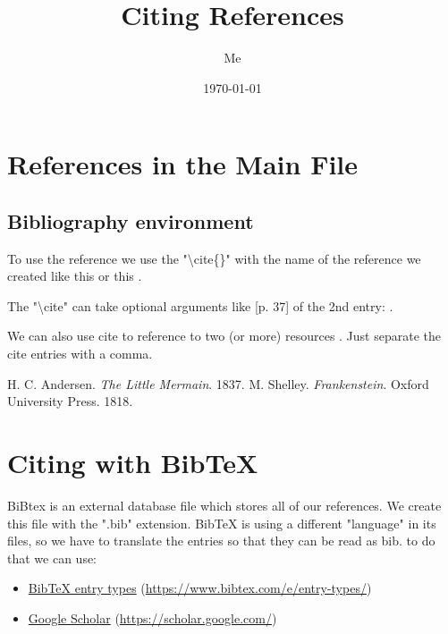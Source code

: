 \documentclass[12pt,titlepage]{article}
\title{Citing References}
\author{Me}
\date{\today}
\begin{document}
\maketitle

\newpage
\thispagestyle{empty}
\tableofcontents
\newpage

\section{References in the Main File}

\subsection{Bibliography environment}
To use the reference we use the "\textbackslash cite\{\}" with the name of the reference we created like this \cite{andersen} or this \cite{shelley}.

The "\textbackslash cite" can take optional arguments like [p. 37] of the 2nd entry: \cite[p.~37]{shelley}.

We can also use cite to reference to two (or more) resources \cite{andersen,shelley}. Just separate the cite entries with a comma.

\begin{thebibliography}{2} %
    H. C. Andersen. \textit{The Little Mermain}. 1837. 
    M. Shelley. \textit{Frankenstein}. Oxford University Press. 1818.
\end{thebibliography}

\section{Citing with BibTeX}
BiBtex is an external database file which stores all of our references. We create this file with the ".bib" extension. BibTeX is using a different "language" in its files, so we have to translate the entries so that they can be read as bib. to do that we can use:
\begin{itemize}
    \item \href{https://www.bibtex.com/e/entry-types/}{BibTeX entry types} (\url{https://www.bibtex.com/e/entry-types/})
    \item \href{https://scholar.google.com/}{Google Scholar} (\url{https://scholar.google.com/})
    
\end{itemize}
\end{document}
